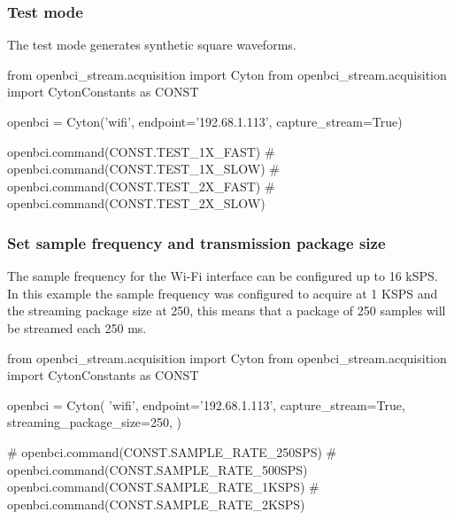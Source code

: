 \subsubsection{Test mode}

The test mode generates synthetic square waveforms.
\begin{python}
from openbci_stream.acquisition import Cyton
from openbci_stream.acquisition import CytonConstants as CONST

openbci = Cyton('wifi', endpoint='192.68.1.113', capture_stream=True)

openbci.command(CONST.TEST_1X_FAST)
# openbci.command(CONST.TEST_1X_SLOW)
# openbci.command(CONST.TEST_2X_FAST)
# openbci.command(CONST.TEST_2X_SLOW)
\end{python}

\subsubsection{Set sample frequency and transmission package size}

The sample frequency for the Wi-Fi interface can be configured up to 16 kSPS. In this example the sample frequency was configured to acquire at 1 KSPS and the streaming package size at 250, this means that a package of 250 samples will be streamed each 250 ms.
\begin{python}
from openbci_stream.acquisition import Cyton
from openbci_stream.acquisition import CytonConstants as CONST

openbci = Cyton(
    'wifi',
    endpoint='192.68.1.113',
    capture_stream=True,
    streaming_package_size=250,
)

# openbci.command(CONST.SAMPLE_RATE_250SPS)
# openbci.command(CONST.SAMPLE_RATE_500SPS)
openbci.command(CONST.SAMPLE_RATE_1KSPS)
# openbci.command(CONST.SAMPLE_RATE_2KSPS)

\end{python}




